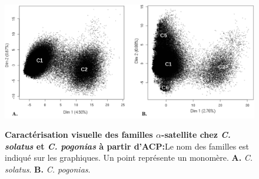 \documentclass[12pt,a4paper]{article}
\begin{document}
		\begin{figure}	
			\includegraphics[scale=0.4]{img/ACP_experimental.png}  \\
			\caption{\textbf{Caractérisation visuelle des familles $\alpha$-satellite chez \textit{C. solatus} et \textit{C. pogonias} à partir d'ACP:}Le nom des familles est indiqué sur les graphiques. Un point représente un monomère. \textbf{A.} \textit{C. solatus}. \textbf{B.} \textit{C. pogonias}.}
			\label{fig:ACP_exp} 
	\end{figure}	
	
\end{document}
